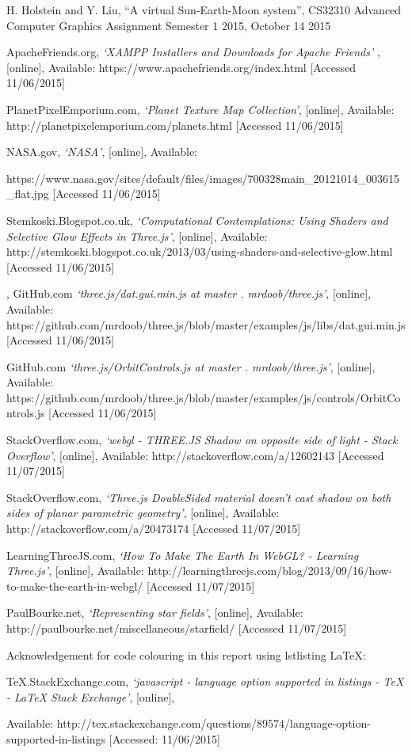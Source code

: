 \documentclass[12pt]{article}
\begin{document}
\begin{thebibliography}{5}

 H. Holstein and Y. Liu, ``A virtual Sun-Earth-Moon system'', CS32310 Advanced Computer Graphics Assignment Semester 1 2015, October 14 2015

 ApacheFriends.org, {\em `XAMPP Installers and Downloads for Apache Friends' }, [online], 
Available: https://www.apachefriends.org/index.html [Accessed 11/06/2015]

 PlanetPixelEmporium.com, {\em `Planet Texture Map Collection'}, [online],
Available: http://planetpixelemporium.com/planets.html [Accessed 11/06/2015]

 NASA.gov, {\em `NASA'}, [online], Available: 

https://www.nasa.gov/sites/default/files/images/700328main\_20121014\_003615\_flat.jpg [Accessed 11/06/2015]

 Stemkoski.Blogspot.co.uk, {\em `Computational Contemplations: Using Shaders and Selective Glow Effects in Three.js'}, [online],
Available: http://stemkoski.blogspot.co.uk/2013/03/using-shaders-and-selective-glow.html [Accessed 11/06/2015]

, GitHub.com {\em `three.js/dat.gui.min.js at master . mrdoob/three.js'}, [online],
Available: https://github.com/mrdoob/three.js/blob/master/examples/js/libs/dat.gui.min.js [Accessed 11/06/2015]

 GitHub.com {\em `three.js/OrbitControls.js at master . mrdoob/three.js'}, [online],
Available: https://github.com/mrdoob/three.js/blob/master/examples/js/controls/OrbitControls.js [Accessed 11/06/2015]

 StackOverflow.com, {\em `webgl - THREE.JS Shadow on opposite side of light - Stack Overflow'}, [online],
Available: http://stackoverflow.com/a/12602143 [Accessed 11/07/2015]

 StackOverflow.com, {\em `Three.js DoubleSided material doesn't cast shadow on both sides of planar parametric geometry'}, [online],
Available: http://stackoverflow.com/a/20473174 [Accessed 11/07/2015]

 LearningThreeJS.com, {\em `How To Make The Earth In WebGL? - Learning Three.js'}, [online],
Available: http://learningthreejs.com/blog/2013/09/16/how-to-make-the-earth-in-webgl/ [Accessed 11/07/2015]

 PaulBourke.net, {\em `Representing star fields'}, [online],
Available: http://paulbourke.net/miscellaneous/starfield/ [Accessed 11/07/2015]

  Acknowledgement for code colouring in this report using lstlisting LaTeX: 

TeX.StackExchange.com, {\em `javascript - language option supported in listings - TeX - LaTeX Stack Exchange'}, [online],

Available: http://tex.stackexchange.com/questions/89574/language-option-supported-in-listings [Accessed: 11/06/2015]

\end{thebibliography}
\end{document}
